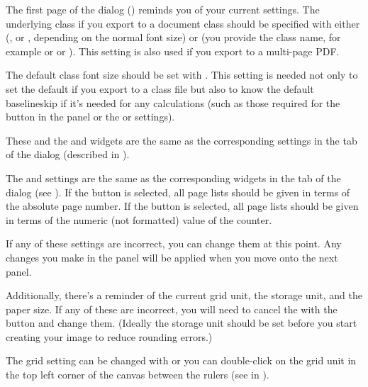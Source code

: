 The first page of the  dialog
() reminds you of your current
settings.  The underlying class if you export to a document class
should be specified with either 
(,  or , depending on the
normal font size) or 
(you provide the class name, for example  or
 or ).
This setting is also used if you export to a multi-page PDF.

The default class font size should be set with
. This setting is needed not only
to set the default if you export to a class file but also to know
the default \gls{baselineskip} if it's needed for any calculations
(such as those required for the 
button in the  panel or the
 or
 settings).

These and the  and
 widgets are the same as the
corresponding settings in the  tab of the
 dialog (described in
).

The  and
 settings are the same as the
corresponding  widgets in the
 tab of the  dialog (see
).  If the
 button is selected, all page
lists should be given in terms of the absolute page number.  If the
 button is selected, all page
lists should be given in terms of the numeric (not formatted) value
of the  counter.

If any of these settings are incorrect, you can change them at this
point.  Any changes you make in the  panel
will be applied when you move onto the next panel.

Additionally, there's a reminder of the current \gls{grid} unit,
the storage unit, and the paper size. If any of these are incorrect, you will need to
cancel the  with the  button and
change them. (Ideally the storage unit should be set before you
start creating your image to reduce rounding errors.)

The \gls{grid} setting can be changed with 
 or you can double-click on the grid unit
in the top left corner of the \gls{canvas} between the
\glspl{ruler} (see  in ).

